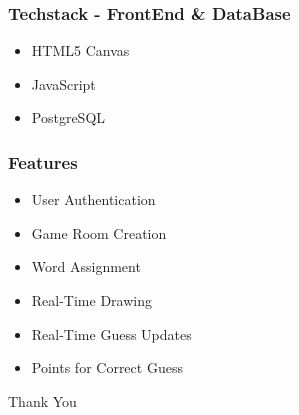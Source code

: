\documentclass{beamer}
\begin{document}
\begin{frame}
    \frametitle{Techstack - FrontEnd \& DataBase}
    \begin{itemize}
        \item HTML5 Canvas
        \vspace{1 mm}
        \item JavaScript
        \vspace{1 mm}
        \item PostgreSQL
    \end{itemize}
\end{frame}

\begin{frame}
    \frametitle{Features}
    \begin{itemize}
        \item User Authentication
        \vspace{1 mm}
        \item Game Room Creation
        \vspace{1 mm}
        \item Word Assignment
        \vspace{1 mm}
        \item Real-Time Drawing
        \vspace{1 mm}
        \item Real-Time Guess Updates
        \vspace{1 mm}
        \item Points for Correct Guess
    \end{itemize}
\end{frame}

\begin{frame}
    \begin{center}
       \large{Thank You}
    \end{center}
\end{frame}
\end{document}
